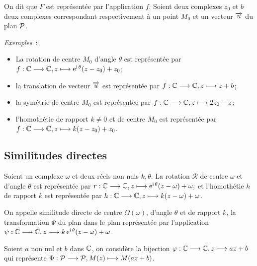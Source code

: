                                 On dit que \(F\) est représentée par l'application \(f\). Soient deux complexes 
                                \(z_0\) et \(b\) deux complexes correspondant respectivement à un point \(M_0\) 
                                et un vecteur \(\vect{u}\) du plan \(\P\).

                                \emph{Exemples}~:
                                \begin{itemize}
                                  \item La rotation de centre \(M_0\) d'angle \(\theta\) est représentée par 
                                    \(\fonctionL{f}{\C}{\C}{z}{\expc{}{\theta}(z-z_0)  + z_0}\);
                                  \item la translation de vecteur \(\vect{u}\) est représentée par 
                                    \(\fonctionL{f}{\C}{\C}{z}{z + b}\);
                                  \item la symétrie de centre \(M_0\) est représentée par 
                                    \(\fonctionL{f}{\C}{\C}{z}{2z_0-z}\);
                                  \item l'homothétie de rapport \(k\neq 0\) et de centre \(M_0\) est 
                                    représentée par \(\fonctionL{f}{\C}{\C}{z}{k(z-z_0) + z_0}\).
                                \end{itemize}

                                \subsection{Similitudes directes}
                                \label{subsec:simdirecte}

                                Soient un complexe \(\omega\) et deux réels non nuls \(k, \theta \). La rotation 
                                \(\mathcal{R}\) de centre \(\omega\) et d'angle \(\theta\) est représentée par 
                                \(\fonctionL{r}{\C}{\C}{z}{\expc{}{\theta}(z-\omega) + \omega},\) et 
                                l'homothétie \(h\) de rapport \(k\) est représentée par 
                                \(\fonctionL{h}{\C}{\C}{z}{k(z-\omega) + \omega}\).

                                \begin{defdef}
                                  On appelle similitude directe de centre \(\Omega(\omega)\), d'angle 
                                  \(\theta\) et de rapport \(k\), la transformation \(\Psi\) du plan 
                                  dans le plan représentée par l'application 
                                  \(\fonctionL{\psi}{\C}{\C}{z}{\expc{k}{\theta}(z-\omega) + \omega}\).
                                \end{defdef}
                                Soient \(a\) non nul et \(b\) dans \(\C\), on considère la bijection 
                                \(\fonctionL{\varphi}{\C}{\C}{z}{az + b}\) qui représente 
                                \(\fonctionL{\Phi}{\P}{\P}{M(z)}{M(az + b)}\).

